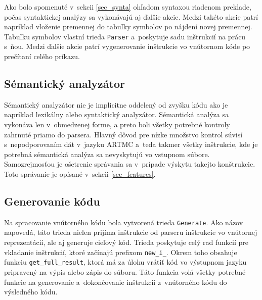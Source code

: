 Ako bolo spomenuté v~sekcii \ref{sec_synta} ohľadom syntaxou riadenom preklade, počas syntaktickej analýzy sa vykonávajú aj ďalšie akcie. Medzi takéto akcie patrí napríklad vloženie premennej do tabuľky symbolov po nájdení novej premennej. Tabuľku symbolov vlastní trieda \texttt{Parser} a~poskytuje sadu inštrukcií na prácu s~ňou. Medzi ďalšie akcie patrí vygenerovanie inštrukcie vo vnútornom kóde po prečítaní celého príkazu. 

\subsection{Sémantický analyzátor}
Sémantický analyzátor nie je implicitne oddelený od zvyšku kódu ako je napríklad lexikálny alebo syntaktický analyzátor. Sémantická analýza sa vykonáva len v~obmedzenej forme, a preto boli všetky potrebné kontroly zahrnuté priamo do parsera. Hlavný dôvod pre nízke množstvo kontrol súvisí s~nepodporovaním dát v~jazyku ARTMC a~teda takmer všetky inštrukcie, kde je potrebná sémantická analýza sa nevyskytujú vo vstupnom súbore. Samozrejmosťou je ošetrenie správania sa v~prípade výskytu takejto konštrukcie. Toto správanie je opísané v~sekcii \ref{sec_features}.

\subsection{Generovanie kódu}
Na spracovanie vnútorného kódu bola vytvorená trieda \texttt{Generate}. Ako názov napovedá, táto trieda nielen prijíma inštrukcie od parseru inštrukcie vo vnútornej reprezentácií, ale aj generuje cieľový kód. Trieda poskytuje celý rad funkcií pre vkladanie inštrukcií, ktoré začínajú prefixom \texttt{new\_i\_}. Okrem toho obsahuje funkciu \texttt{get\_full\_result}, ktorá má za úlohu vrátiť kód vo výstupnom jazyku pripravený na výpis alebo zápis do súboru. Táto funkcia volá všetky potrebné funkcie na generovanie a~dokončovanie inštrukcií z~vnútorného kódu do výsledného kódu.

